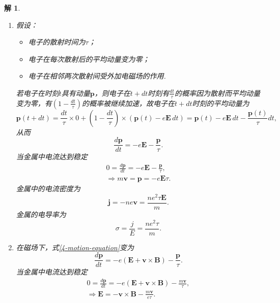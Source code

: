 \documentclass[UTF8,10pt,a4paper]{article}
\theoremstyle{Problem}
\theoremstyle{Solution}
\newtheorem*{sol}{解}
\begin{document}
\begin{sol}
    \begin{enumerate}
        \item[(a)] 假设：
        \begin{itemize}
            \item 电子的散射时间为$\tau$；
            \item 电子在每次散射后的平均动量变为零；
            \item 电子在相邻两次散射间受外加电磁场的作用.
        \end{itemize}
        若电子在时刻$t$具有动量$\bm{p}$，则电子在$t+dt$时刻有$\frac{dt}{\tau}$的概率因为散射而平均动量变为零，有$\left(1-\frac{dt}{\tau}\right)$的概率被继续加速，故电子在$t+dt$时刻的平均动量为
        \begin{equation}
            \bm{p}(t+dt)=\frac{dt}{\tau}\times 0+\left(1-\frac{dt}{\tau}\right)\times(\bm{p}(t)-e\bm{E}\,dt)=\bm{p}(t)-e\bm{E}\,dt-\frac{\bm{p}(t)}{\tau}dt,
        \end{equation}
        从而
        \begin{equation}
            \label{4-motion-equation}
            \frac{d\bm{p}}{dt}=-e\bm{E}-\frac{\bm{p}}{\tau}.
        \end{equation}
        当金属中电流达到稳定
        \begin{gather}
            0=\frac{d\bm{p}}{dt}=-e\bm{E}-\frac{\bm{p}}{\tau},\\
            \Longrightarrow m\bm{v}=\bm{p}=-e\bm{E}\tau.
        \end{gather}
        金属中的电流密度为
        \begin{equation}
            \bm{j}=-ne\bm{v}=\frac{ne^2\tau\bm{E}}{m}.
        \end{equation}
        金属的电导率为
        \begin{equation}
            \sigma=\frac{j}{E}=\frac{ne^2\tau}{m}.
        \end{equation}
        \item[(b)] 在磁场下，式\eqref{4-motion-equation}变为
        \begin{equation}
            \frac{d\bm{p}}{dt}=-e(\bm{E}+\bm{v}\times\bm{B})-\frac{\bm{p}}{\tau}.
        \end{equation}
        当金属中电流达到稳定
        \begin{gather}
            0=\frac{d\bm{p}}{dt}=-e(\bm{E}+\bm{v}\times\bm{B})-\frac{m\bm{v}}{\tau},\\
            \Longrightarrow\bm{E}=-\bm{v}\times\bm{B}-\frac{m\bm{v}}{e\tau}.

\end{gather}
\end{enumerate}
\end{sol}
\end{document}
